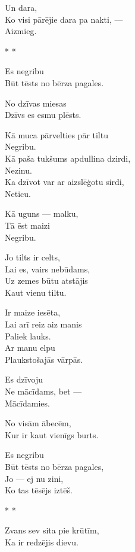 \documentclass[14pt]{extarticle}
\begin{document}
Un dara,\\
Ko visi pārējie dara pa nakti, ---\\
Aizmieg.


\newpage

{\large \sc * * *}

Es negribu\\
Būt tēsts no bērza pagales.

No dzīvas miesas\\
Dzīvs es esmu plēsts.

Kā muca pārvelties pār tiltu\\
Negribu.\\
Kā paša tukšums apdullina dzirdi,\\
Nezinu.\\
Ka dzīvot var ar aizslēģotu sirdi,\\
Neticu.

Kā uguns --- malku,\\
Tā ēst maizi\\
Negribu.

Jo tilts ir celts,\\
Lai es, vairs nebūdams,\\
Uz zemes būtu atstājis\\
Kaut vienu tiltu.

Ir maize iesēta,\\
Lai arī reiz aiz manis\\
Paliek lauks.\\
Ar manu elpu\\
Plaukstošajās vārpās.

Es dzīvoju\\
Ne mācīdams, bet ---\\
Mācīdamies.

No visām ābecēm,\\
Kur ir kaut vienīgs burts.

Es negribu\\
Būt tēsts no bērza pagales,\\
Jo --- ej nu zini,\\
Ko tas tēsējs iztēš.


\newpage

{\large \sc * * *}

Zvans sev sita pie krūtīm,\\
Ka ir redzējis dievu.
\end{document}
